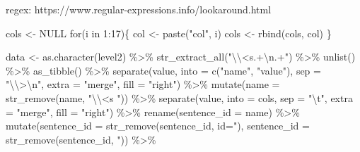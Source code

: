 \documentclass[
  letterpaper,
]{scrbook}
\newenvironment{Shaded}{\begin{snugshade}}{\end{snugshade}}
\newcommand{\AttributeTok}[1]{\textcolor[rgb]{0.40,0.45,0.13}{#1}}
\newcommand{\ConstantTok}[1]{\textcolor[rgb]{0.56,0.35,0.01}{#1}}
\newcommand{\ControlFlowTok}[1]{\textcolor[rgb]{0.00,0.23,0.31}{#1}}
\newcommand{\DecValTok}[1]{\textcolor[rgb]{0.68,0.00,0.00}{#1}}
\newcommand{\FunctionTok}[1]{\textcolor[rgb]{0.28,0.35,0.67}{#1}}
\newcommand{\NormalTok}[1]{\textcolor[rgb]{0.00,0.23,0.31}{#1}}
\newcommand{\OtherTok}[1]{\textcolor[rgb]{0.00,0.23,0.31}{#1}}
\newcommand{\SpecialCharTok}[1]{\textcolor[rgb]{0.37,0.37,0.37}{#1}}
\newcommand{\StringTok}[1]{\textcolor[rgb]{0.13,0.47,0.30}{#1}}
\begin{document}
regex: https://www.regular-expressions.info/lookaround.html

\begin{Shaded}
\begin{Highlighting}[]
\NormalTok{cols }\OtherTok{\textless{}{-}} \ConstantTok{NULL}
\ControlFlowTok{for}\NormalTok{(i }\ControlFlowTok{in} \DecValTok{1}\SpecialCharTok{:}\DecValTok{17}\NormalTok{)\{}
\NormalTok{  col }\OtherTok{\textless{}{-}} \FunctionTok{paste}\NormalTok{(}\StringTok{"col"}\NormalTok{, i)}
\NormalTok{  cols }\OtherTok{\textless{}{-}} \FunctionTok{rbind}\NormalTok{(cols, col)}
\NormalTok{\}}

\NormalTok{data }\OtherTok{\textless{}{-}} \FunctionTok{as.character}\NormalTok{(level2) }\SpecialCharTok{\%\textgreater{}\%} 
  \FunctionTok{str\_extract\_all}\NormalTok{(}\StringTok{"}\SpecialCharTok{\textbackslash{}\textbackslash{}}\StringTok{\textless{}s.+}\SpecialCharTok{\textbackslash{}n}\StringTok{.+"}\NormalTok{) }\SpecialCharTok{\%\textgreater{}\%} 
  \FunctionTok{unlist}\NormalTok{() }\SpecialCharTok{\%\textgreater{}\%} 
  \FunctionTok{as\_tibble}\NormalTok{() }\SpecialCharTok{\%\textgreater{}\%} 
  \FunctionTok{separate}\NormalTok{(value, }\AttributeTok{into =} \FunctionTok{c}\NormalTok{(}\StringTok{"name"}\NormalTok{, }\StringTok{"value"}\NormalTok{), }
           \AttributeTok{sep =} \StringTok{"}\SpecialCharTok{\textbackslash{}\textbackslash{}}\StringTok{\textgreater{}}\SpecialCharTok{\textbackslash{}n}\StringTok{"}\NormalTok{, }\AttributeTok{extra =} \StringTok{"merge"}\NormalTok{, }\AttributeTok{fill =} \StringTok{"right"}\NormalTok{) }\SpecialCharTok{\%\textgreater{}\%} 
  \FunctionTok{mutate}\NormalTok{(}\AttributeTok{name =} \FunctionTok{str\_remove}\NormalTok{(name, }\StringTok{"}\SpecialCharTok{\textbackslash{}\textbackslash{}}\StringTok{\textless{}s "}\NormalTok{)) }\SpecialCharTok{\%\textgreater{}\%} 
  \FunctionTok{separate}\NormalTok{(value, }\AttributeTok{into =}\NormalTok{ cols, }
           \AttributeTok{sep =} \StringTok{"}\SpecialCharTok{\textbackslash{}t}\StringTok{"}\NormalTok{, }\AttributeTok{extra =} \StringTok{"merge"}\NormalTok{, }\AttributeTok{fill =} \StringTok{"right"}\NormalTok{) }\SpecialCharTok{\%\textgreater{}\%} 
  \FunctionTok{rename}\NormalTok{(}\AttributeTok{sentence\_id =}\NormalTok{ name) }\SpecialCharTok{\%\textgreater{}\%} 
  \FunctionTok{mutate}\NormalTok{(}\AttributeTok{sentence\_id =} \FunctionTok{str\_remove}\NormalTok{(sentence\_id, }\StringTok{\textquotesingle{}id="\textquotesingle{}}\NormalTok{),}
         \AttributeTok{sentence\_id =} \FunctionTok{str\_remove}\NormalTok{(sentence\_id, }\StringTok{\textquotesingle{}"\textquotesingle{}}\NormalTok{)) }\SpecialCharTok{\%\textgreater{}\%} 

\end{Highlighting}
\end{Shaded}
\end{document}
